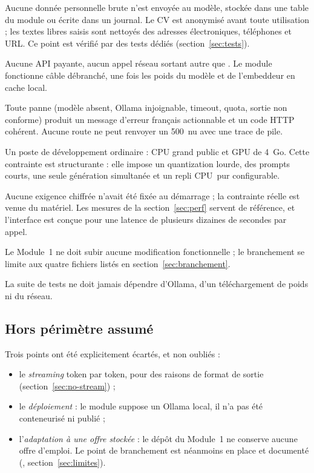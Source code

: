 \begin{description}[leftmargin=1.4em,itemsep=3pt,topsep=3pt,style=nextline]
  \item[N1 --- Confidentialité.] Aucune donnée personnelle brute n'est envoyée
    au modèle, stockée dans une table du module ou écrite dans un journal.
    Le CV est anonymisé avant toute utilisation ; les textes libres saisis sont
    nettoyés des adresses électroniques, téléphones et URL.
    Ce point est vérifié par des tests dédiés (section~\ref{sec:tests}).
  \item[N2 --- Local et hors ligne.] Aucune API payante, aucun appel réseau
    sortant autre que . Le module fonctionne câble débranché,
    une fois les poids du modèle et de l'embeddeur en cache local.
  \item[N3 --- Robustesse.] Toute panne (modèle absent, Ollama injoignable,
    timeout, quota, sortie non conforme) produit un message d'erreur français
    actionnable et un code HTTP cohérent. Aucune route ne peut renvoyer un
    500~nu avec une trace de pile.
  \item[N4 --- Cible matérielle.] Un poste de développement ordinaire :
    CPU grand public et GPU de 4~Go. Cette contrainte est structurante : elle
    impose un quantization lourde, des prompts courts, une seule génération
    simultanée et un repli CPU~pur configurable.
  \item[N5 --- Latence.] Aucune exigence chiffrée n'avait été fixée au
    démarrage ; la contrainte réelle est venue du matériel. Les mesures de la
    section~\ref{sec:perf} servent de référence, et l'interface est conçue pour
    une latence de plusieurs dizaines de secondes par appel.
  \item[N6 --- Non-régression.] Le Module~1 ne doit subir aucune modification
    fonctionnelle ; le branchement se limite aux quatre fichiers listés en
    section~\ref{sec:branchement}.
  \item[N7 --- Testabilité.] La suite de tests ne doit jamais dépendre
    d'Ollama, d'un téléchargement de poids ni du réseau.
\end{description}

\subsection{Hors périmètre assumé}

Trois points ont été explicitement écartés, et non oubliés :

\begin{itemize}[leftmargin=1.6em,itemsep=1pt,topsep=2pt]
  \item le \emph{streaming} token par token, pour des raisons de format de
    sortie (section~\ref{sec:no-stream}) ;
  \item le \emph{déploiement} : le module suppose un Ollama local, il n'a pas
    été conteneurisé ni publié ;
  \item l'\emph{adaptation à une offre stockée} : le dépôt du Module~1 ne
    conserve aucune offre d'emploi. Le point de branchement est néanmoins en
    place et documenté (,
    section~\ref{sec:limites}).
\end{itemize}
